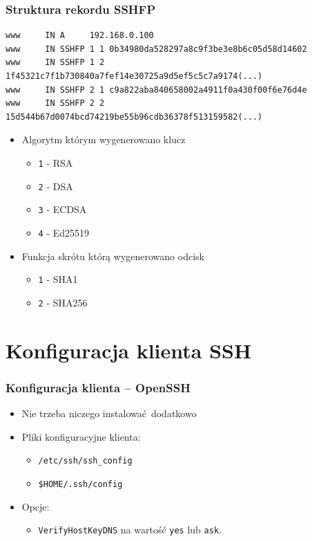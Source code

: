 \documentclass[dvipsnames,table]{beamer}
\begin{document}
\begin{frame}[fragile]
\frametitle{Struktura rekordu SSHFP}
\scriptsize
\begin{verbatim}
www		IN A	 192.168.0.100
www		IN SSHFP 1 1 0b34980da528297a8c9f3be3e8b6c05d58d14602
www		IN SSHFP 1 2 1f45321c7f1b730840a7fef14e30725a9d5ef5c5c7a9174(...)
www		IN SSHFP 2 1 c9a822aba840658002a4911f0a430f00f6e76d4e
www		IN SSHFP 2 2 15d544b67d0074bcd74219be55b96cdb36378f513159582(...)
\end{verbatim}
\normalsize
\begin{itemize}
	\item Algorytm którym wygenerowano klucz
	\begin{itemize}
		\item {\tt 1} - RSA
		\item {\tt 2} - DSA
		\item {\tt 3} - ECDSA
		\item {\tt 4} - Ed25519
	\end{itemize}
	\item Funkcja skrótu którą wygenerowano odcisk
	\begin{itemize}
		\item {\tt 1} - SHA1
		\item {\tt 2} - SHA256
	\end{itemize}
\end{itemize}
\end{frame}

\section{Konfiguracja klienta SSH}

\begin{frame}
\frametitle{Konfiguracja klienta -- OpenSSH}
\begin{itemize}
	\item Nie trzeba niczego instalować dodatkowo \Smiley
	\item Pliki konfiguracyjne klienta:
	\begin{itemize}
		\item {\tt /etc/ssh/ssh\_config}
		\item {\tt \$HOME/.ssh/config}
	\end{itemize}
	\item Opcje:
	\begin{itemize}
		\item {\tt VerifyHostKeyDNS} na wartość {\tt yes} lub {\tt ask}.
	\end{itemize}
\end{itemize}
\end{frame}
\end{document}

